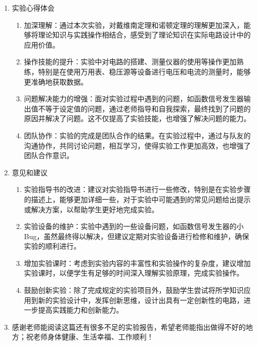 \documentclass[dvipsnames, svgnames,a4paper,11pt]{article}
\begin{document}
	\begin{enumerate}
		\item 实验心得体会
		\begin{enumerate}
			\item 加深理解：通过本次实验，对戴维南定理和诺顿定理的理解更加深入，能够将理论知识与实践操作相结合，感受到了理论知识在实际电路设计中的应用价值。
			
			\item 操作技能的提升：实验中对电路的搭建、测量仪器的使用等操作更加熟练，特别是在使用万用表、稳压源等设备进行电压和电流的测量时，能够更准确地获取数据。
			
			\item 问题解决能力的增强：面对实验过程中遇到的问题，如函数信号发生器输出值不等于设定值的问题，通过老师指导和自我探索，最终找到了问题的原因并解决了问题。这不仅提高了实验技能，也增强了解决问题的能力。
			
			\item 团队协作：实验的完成是团队合作的结果。在实验过程中，通过与队友的沟通协作，共同讨论问题，相互学习，使得实验工作更加高效，也增强了团队合作意识。
		\end{enumerate}
		
		\item 意见和建议
			\begin{enumerate}
				\item 实验指导书的改进：建议对实验指导书进行一些修改，特别是在实验步骤的描述上，能够更加详细一些，对于实验中可能遇到的常见问题给出提示或解决方案，以帮助学生更好地完成实验。
				
				\item 实验设备的维护：实验中遇到的一些设备问题，如函数信号发生器的小Bug，虽然最终得以解决，但建议定期对实验设备进行检修和维护，确保实验的顺利进行。
				
				\item 增加实验课时：考虑到实验内容的丰富性和实验操作的复杂度，建议增加实验课时，以便学生有足够的时间深入理解实验原理，完成实验操作。
				
				\item 鼓励创新实验：除了完成规定的实验项目外，鼓励学生尝试将所学知识应用到新的实验设计中，发挥创新思维，设计出具有一定创新性的电路，进一步提高实践能力和创新能力。
			\end{enumerate}
			
		\item 感谢老师能阅读这篇还有很多不足的实验报告，希望老师能指出做得不好的地方；祝老师身体健康、生活幸福、工作顺利！
	\end{enumerate}
	
\end{document}
